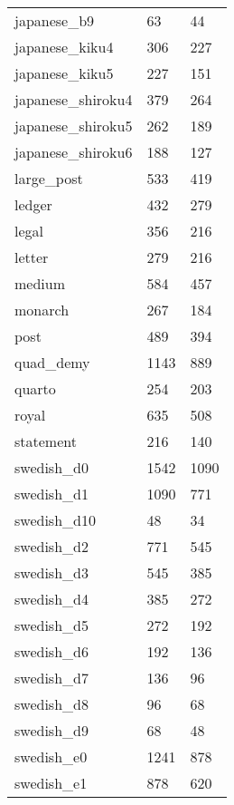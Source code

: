 {\begin{supertabular}{|lll|}
               japanese\_b9 &     63 &     44\\
            japanese\_kiku4 &    306 &    227\\
            japanese\_kiku5 &    227 &    151\\
         japanese\_shiroku4 &    379 &    264\\
         japanese\_shiroku5 &    262 &    189\\
         japanese\_shiroku6 &    188 &    127\\
                large\_post &    533 &    419\\
                     ledger &    432 &    279 \\
                      legal &    356 &    216 \\
                     letter &    279 &    216 \\
                     medium &    584 &    457 \\
                    monarch &    267 &    184 \\
                       post &    489 &    394 \\
                 quad\_demy &   1143 &   889 \\
                     quarto &    254 &    203 \\
                      royal &    635 &    508 \\
                  statement &    216 &    140 \\
                swedish\_d0 &   1542 &   1090 \\
                swedish\_d1 &   1090 &    771 \\
               swedish\_d10 &     48 &     34 \\
                swedish\_d2 &    771 &    545 \\
                swedish\_d3 &    545 &    385 \\
                swedish\_d4 &    385 &    272 \\
                swedish\_d5 &    272 &    192 \\
                swedish\_d6 &    192 &    136 \\
                swedish\_d7 &    136 &     96 \\
                swedish\_d8 &     96 &     68 \\
                swedish\_d9 &     68 &     48 \\
                swedish\_e0 &   1241 &    878 \\
                swedish\_e1 &    878 &    620 \\

\end{supertabular}}
